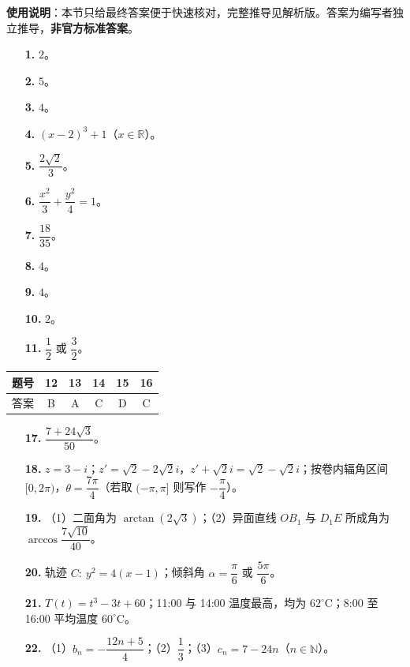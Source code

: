 
\begin{gknotice}
\textbf{使用说明}：本节只给最终答案便于快速核对，完整推导见解析版。答案为编写者独立推导，\textbf{非官方标准答案}。
\end{gknotice}

\begin{itemize}[leftmargin=2.6em]
  \item[\textbf{1.}] $2$。
  \item[\textbf{2.}] $5$。
  \item[\textbf{3.}] $4$。
  \item[\textbf{4.}] $(x-2)^3+1$（$x\in\mathbb R$）。
  \item[\textbf{5.}] $\dfrac{2\sqrt2}{3}$。
  \item[\textbf{6.}] $\dfrac{x^2}{3}+\dfrac{y^2}{4}=1$。
  \item[\textbf{7.}] $\dfrac{18}{35}$。
  \item[\textbf{8.}] $4$。
  \item[\textbf{9.}] $4$。
  \item[\textbf{10.}] $2$。
  \item[\textbf{11.}] $\dfrac12$ 或 $\dfrac32$。
\end{itemize}

\begin{center}\begin{tabular}{cccccc}
\toprule
题号 & 12 & 13 & 14 & 15 & 16 \\
\midrule
答案 & B & A & C & D & C \\
\bottomrule
\end{tabular}\end{center}

\begin{itemize}[leftmargin=2.6em]
  \item[\textbf{17.}] $\dfrac{7+24\sqrt3}{50}$。
  \item[\textbf{18.}] $z=3-i$；$z'=\sqrt2-2\sqrt2 i$，$z'+\sqrt2 i=\sqrt2-\sqrt2 i$；按卷内辐角区间 $[0,2\pi)$，$\theta=\dfrac{7\pi}{4}$（若取 $(-\pi,\pi]$ 则写作 $-\dfrac\pi4$）。
  \item[\textbf{19.}] （1）二面角为 $\arctan(2\sqrt3)$；（2）异面直线 $OB_1$ 与 $D_1E$ 所成角为 $\arccos\dfrac{7\sqrt{10}}{40}$。
  \item[\textbf{20.}] 轨迹 $C:\ y^2=4(x-1)$；倾斜角 $\alpha=\dfrac\pi6$ 或 $\dfrac{5\pi}6$。
  \item[\textbf{21.}] $T(t)=t^3-3t+60$；11:00 与 14:00 温度最高，均为 $62^\circ\mathrm C$；8:00 至 16:00 平均温度 $60^\circ\mathrm C$。
  \item[\textbf{22.}] （1）$b_n=-\dfrac{12n+5}{4}$；（2）$\dfrac13$；（3）$c_n=7-24n$（$n\in\mathbb N$）。
\end{itemize}
